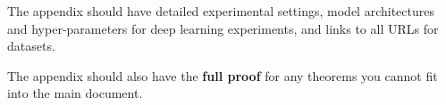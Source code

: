 The appendix should have detailed experimental settings, model architectures and hyper-parameters for deep learning experiments, and links to all URLs for datasets. 

The appendix should also have the \textbf{full proof} for any theorems you cannot fit into the main document.
